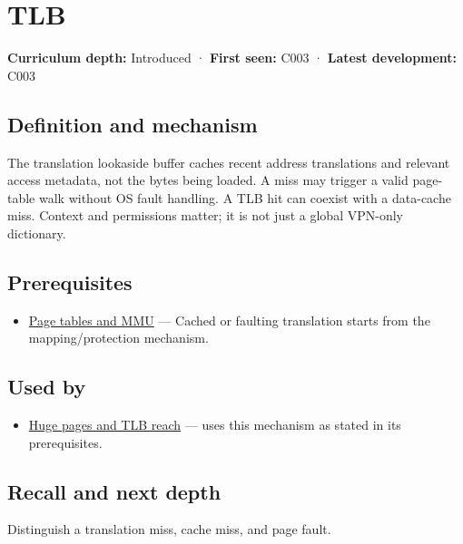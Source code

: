 \hypertarget{appendix-7a2d9c5ce511}{}
\section{TLB}\label{appendix-7a2d9c5ce511-tlb}

\textbf{Curriculum depth:} Introduced · \textbf{First seen:} C003 · \textbf{Latest development:} C003

\subsection{Definition and mechanism}\label{appendix-7a2d9c5ce511-definition-and-mechanism}

The translation lookaside buffer caches recent address translations and relevant access metadata, not the bytes being loaded. A miss may trigger a valid page-table walk without OS fault handling. A TLB hit can coexist with a data-cache miss. Context and permissions matter; it is not just a global VPN-only dictionary.

\subsection{Prerequisites}\label{appendix-7a2d9c5ce511-prerequisites}

\begin{itemize}
\tightlist
\item
  \hyperref[appendix-01e5905165c4]{Page tables and MMU} --- Cached or faulting translation starts from the mapping/protection mechanism.
\end{itemize}

\subsection{Used by}\label{appendix-7a2d9c5ce511-used-by}

\begin{itemize}
\tightlist
\item
  \hyperref[appendix-ce688d1acdab]{Huge pages and TLB reach} --- uses this mechanism as stated in its prerequisites.
\end{itemize}

\subsection{Recall and next depth}\label{appendix-7a2d9c5ce511-recall-and-next-depth}

Distinguish a translation miss, cache miss, and page fault.

